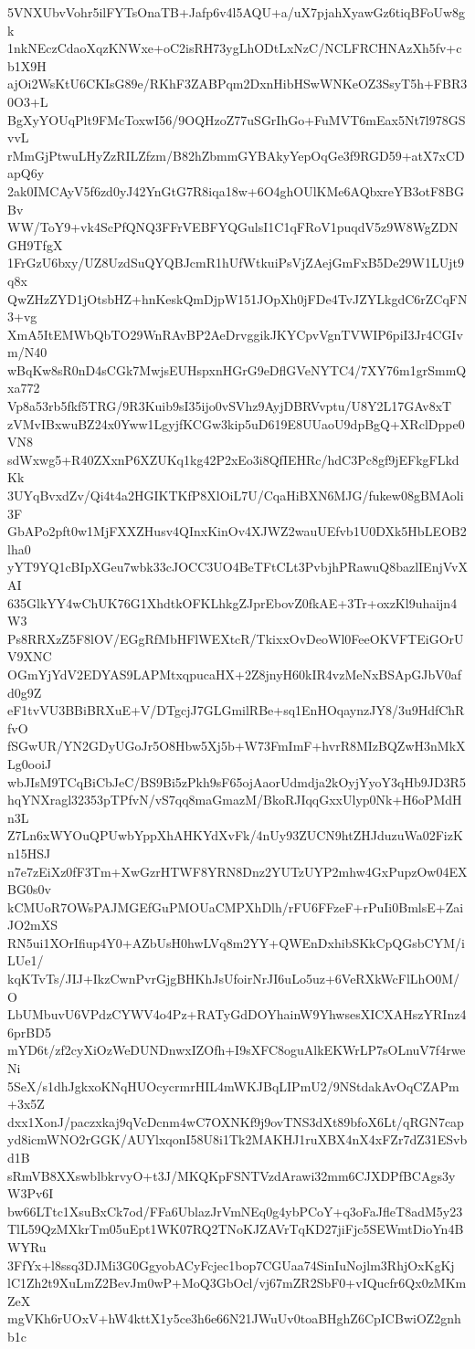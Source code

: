 5VNXUbvVohr5ilFYTsOnaTB+Jafp6v4l5AQU+a/uX7pjahXyawGz6tiqBFoUw8gk
1nkNEczCdaoXqzKNWxe+oC2isRH73ygLhODtLxNzC/NCLFRCHNAzXh5fv+cb1X9H
ajOi2WsKtU6CKIsG89e/RKhF3ZABPqm2DxnHibHSwWNKeOZ3SsyT5h+FBR30O3+L
BgXyYOUqPlt9FMcToxwI56/9OQHzoZ77uSGrIhGo+FuMVT6mEax5Nt7l978GSvvL
rMmGjPtwuLHyZzRILZfzm/B82hZbmmGYBAkyYepOqGe3f9RGD59+atX7xCDapQ6y
2ak0IMCAyV5f6zd0yJ42YnGtG7R8iqa18w+6O4ghOUlKMe6AQbxreYB3otF8BGBv
WW/ToY9+vk4ScPfQNQ3FFrVEBFYQGulsI1C1qFRoV1puqdV5z9W8WgZDNGH9TfgX
1FrGzU6bxy/UZ8UzdSuQYQBJcmR1hUfWtkuiPsVjZAejGmFxB5De29W1LUjt9q8x
QwZHzZYD1jOtsbHZ+hnKeskQmDjpW151JOpXh0jFDe4TvJZYLkgdC6rZCqFN3+vg
XmA5ItEMWbQbTO29WnRAvBP2AeDrvggikJKYCpvVgnTVWIP6piI3Jr4CGIvm/N40
wBqKw8sR0nD4sCGk7MwjsEUHspxnHGrG9eDflGVeNYTC4/7XY76m1grSmmQxa772
Vp8a53rb5fkf5TRG/9R3Kuib9sI35ijo0vSVhz9AyjDBRVvptu/U8Y2L17GAv8xT
zVMvIBxwuBZ24x0Yww1LgyjfKCGw3kip5uD619E8UUaoU9dpBgQ+XRclDppe0VN8
sdWxwg5+R40ZXxnP6XZUKq1kg42P2xEo3i8QfIEHRc/hdC3Pc8gf9jEFkgFLkdKk
3UYqBvxdZv/Qi4t4a2HGIKTKfP8XlOiL7U/CqaHiBXN6MJG/fukew08gBMAoli3F
GbAPo2pft0w1MjFXXZHusv4QInxKinOv4XJWZ2wauUEfvb1U0DXk5HbLEOB2lha0
yYT9YQ1cBIpXGeu7wbk33cJOCC3UO4BeTFtCLt3PvbjhPRawuQ8bazlIEnjVvXAI
635GlkYY4wChUK76G1XhdtkOFKLhkgZJprEbovZ0fkAE+3Tr+oxzKl9uhaijn4W3
Ps8RRXzZ5F8lOV/EGgRfMbHFlWEXtcR/TkixxOvDeoWl0FeeOKVFTEiGOrUV9XNC
OGmYjYdV2EDYAS9LAPMtxqpucaHX+2Z8jnyH60kIR4vzMeNxBSApGJbV0afd0g9Z
eF1tvVU3BBiBRXuE+V/DTgcjJ7GLGmilRBe+sq1EnHOqaynzJY8/3u9HdfChRfvO
fSGwUR/YN2GDyUGoJr5O8Hbw5Xj5b+W73FmImF+hvrR8MIzBQZwH3nMkXLg0ooiJ
wbJIsM9TCqBiCbJeC/BS9Bi5zPkh9sF65ojAaorUdmdja2kOyjYyoY3qHb9JD3R5
hqYNXragl32353pTPfvN/vS7qq8maGmazM/BkoRJIqqGxxUlyp0Nk+H6oPMdHn3L
Z7Ln6xWYOuQPUwbYppXhAHKYdXvFk/4nUy93ZUCN9htZHJduzuWa02FizKn15HSJ
n7e7zEiXz0fF3Tm+XwGzrHTWF8YRN8Dnz2YUTzUYP2mhw4GxPupzOw04EXBG0s0v
kCMUoR7OWsPAJMGEfGuPMOUaCMPXhDlh/rFU6FFzeF+rPuIi0BmlsE+ZaiJO2mXS
RN5ui1XOrIfiup4Y0+AZbUsH0hwLVq8m2YY+QWEnDxhibSKkCpQGsbCYM/iLUe1/
kqKTvTs/JIJ+IkzCwnPvrGjgBHKhJsUfoirNrJI6uLo5uz+6VeRXkWcFlLhO0M/O
LbUMbuvU6VPdzCYWV4o4Pz+RATyGdDOYhainW9YhwsesXICXAHszYRInz46prBD5
mYD6t/zf2cyXiOzWeDUNDnwxIZOfh+I9sXFC8oguAlkEKWrLP7sOLnuV7f4rweNi
5SeX/s1dhJgkxoKNqHUOcycrmrHIL4mWKJBqLIPmU2/9NStdakAvOqCZAPm+3x5Z
dxx1XonJ/paczxkaj9qVcDcnm4wC7OXNKf9j9ovTNS3dXt89bfoX6Lt/qRGN7cap
yd8icmWNO2rGGK/AUYlxqonI58U8i1Tk2MAKHJ1ruXBX4nX4xFZr7dZ31ESvbd1B
sRmVB8XXswblbkrvyO+t3J/MKQKpFSNTVzdArawi32mm6CJXDPfBCAgs3yW3Pv6I
bw66LTtc1XsuBxCk7od/FFa6UblazJrVmNEq0g4ybPCoY+q3oFaJfleT8adM5y23
TlL59QzMXkrTm05uEpt1WK07RQ2TNoKJZAVrTqKD27jiFjc5SEWmtDioYn4BWYRu
3FfYx+l8ssq3DJMi3G0GgyobACyFcjec1bop7CGUaa74SinIuNojlm3RhjOxKgKj
lC1Zh2t9XuLmZ2BevJm0wP+MoQ3GbOcl/vj67mZR2SbF0+vIQucfr6Qx0zMKmZeX
mgVKh6rUOxV+hW4kttX1y5ce3h6e66N21JWuUv0toaBHghZ6CpICBwiOZ2gnhb1c
